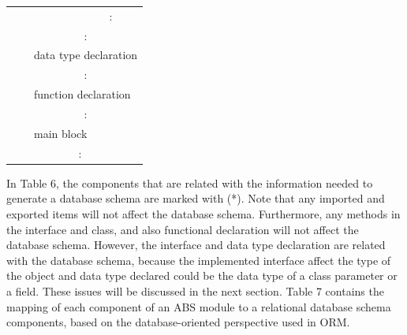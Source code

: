 \documentclass[runningheads,a4paper]{llncs}
\begin{document}
\begin{table}[]
\begin{tabular}{|l|l|l|l|l|}
		&                          &                            & \multicolumn{2}{c|}{:}                     \\ \cline{3-5} 
		&                          & \multicolumn{3}{c|}{:}                                                  \\ \cline{3-5} 
		&                          & \multicolumn{3}{l|}{data type declaration}                              \\ \cline{3-5} 
		&                          & \multicolumn{3}{c|}{:}                                                  \\ \cline{3-5} 
		&                          & \multicolumn{3}{l|}{function declaration}                               \\ \cline{3-5} 
		&                          & \multicolumn{3}{c|}{:}                                                  \\ \cline{3-5} 
		&                          & \multicolumn{3}{l|}{main block}                                         \\ \cline{2-5} 
		& \multicolumn{4}{c|}{:}                                                                             \\ \hline
	\end{tabular}
\end{table}

In Table 6, the components that are related with the information needed to generate a database schema are marked with (*). Note that any imported and exported items will not affect the database schema. Furthermore, any methods in the interface and class, and also functional declaration will not affect the database schema. However, the interface and data type declaration are related with the database schema, because the implemented interface affect the type of the object and data type declared could be the data type of a class parameter or a field. These issues will be discussed in the next section. Table 7 contains the mapping of each component of an ABS module to a relational database schema components, based on the database-oriented perspective used in ORM. 
\end{document}
